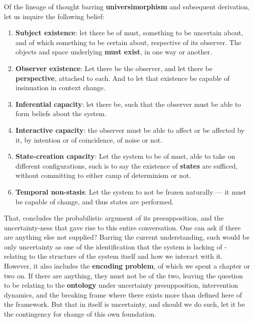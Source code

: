 \begin{principle}
    Of the lineage of thought barring \textbf{universimorphism} and subsequent derivation, let us inquire the following belief:
    \begin{enumerate}[itemsep=1pt,topsep=0.5pt]
        \item \textbf{Subject existence}: let there be of must, something to be uncertain about, and of which something to be certain about, respective of its observer. The objects and space underlying \textbf{must exist}, in one way or another. 
        \item \textbf{Observer existence}: Let there be the observer, and let there be \textbf{perspective}, attached to each. And to let that existence be capable of insinuation in context change. 
        \item \textbf{Inferential capacity}: let there be, such that the observer must be able to form beliefs about the system. 
        \item \textbf{Interactive capacity}: the observer must be able to affect or be affected by it, by intention or of coincidence, of noise or not. 
        \item \textbf{State-creation capacity}: Let the system to be of must, able to take on different configurations, such is to say the existence of \textbf{states} are sufficed, without committing to either camp of determinism or not. 
        \item \textbf{Temporal non-stasis}: Let the system to not be frozen naturally — it must be capable of change, and thus states are performed.
    \end{enumerate}
\end{principle}
That, concludes the probabilistic argument of its presupposition, and the uncertainty-ness that gave rise to this entire conversation. One can ask if there are anything else not supplied? Barring the current understanding, such would be only uncertainty as one of the identification that the system is lacking of - relating to the structure of the system itself and how we interact with it. However, it also includes the \textbf{encoding problem}, of which we spent a chapter or two on. If there are anything, they must not be of the two, leaving the question to be relating to the \textbf{ontology} under uncertainty presupposition, intervention dynamics, and the breaking frame where there exists more than defined here of the framework. But that in itself is uncertainty, and should we do such, let it be the contingency for change of this own foundation. 

